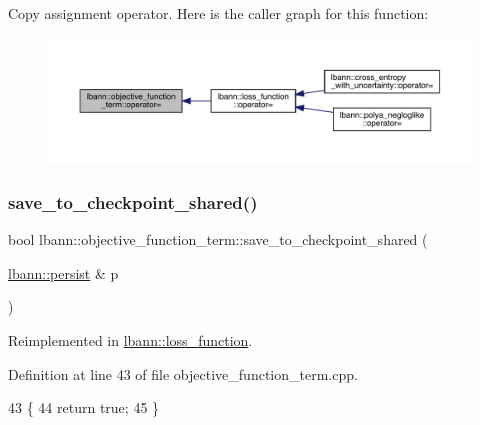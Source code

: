 Copy assignment operator. Here is the caller graph for this function\+:\nopagebreak
\begin{figure}[H]
\begin{center}
\leavevmode
\includegraphics[width=350pt]{classlbann_1_1objective__function__term_a8bbac194d96a854d5841817b67b63334_icgraph}
\end{center}
\end{figure}
\mbox{\label{classlbann_1_1objective__function__term_a4451a6a6fb4d70ac2aed2827f075cd71}} 
\subsubsection{\texorpdfstring{save\+\_\+to\+\_\+checkpoint\+\_\+shared()}{save\_to\_checkpoint\_shared()}}
{\footnotesize\ttfamily bool lbann\+::objective\+\_\+function\+\_\+term\+::save\+\_\+to\+\_\+checkpoint\+\_\+shared (\begin{DoxyParamCaption}\item[{\hyperlink{classlbann_1_1persist}{lbann\+::persist} \&}]{p }\end{DoxyParamCaption})\hspace{0.3cm}{\ttfamily [virtual]}}



Reimplemented in \hyperlink{classlbann_1_1loss__function_ac44929838f3c3f0a34e1532530422dad}{lbann\+::loss\+\_\+function}.



Definition at line 43 of file objective\+\_\+function\+\_\+term.\+cpp.


\begin{DoxyCode}
43                                                                        \{
44   \textcolor{keywordflow}{return} \textcolor{keyword}{true};
45 \}
\end{DoxyCode}
\mbox{\label{classlbann_1_1objective__function__term_a82656dfd81bf6b818b38d041d341bc3b}} 
